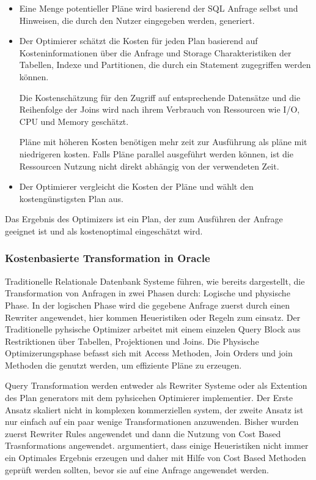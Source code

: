 \begin{itemize}
\item Eine Menge potentieller Pläne wird basierend der SQL Anfrage selbst und Hinweisen, die durch den Nutzer eingegeben werden, generiert.
\item Der Optimierer schätzt die Kosten für jeden Plan basierend auf Kosteninformationen über die Anfrage und Storage Charakteristiken der Tabellen, Indexe und Partitionen, die durch ein Statement zugegriffen werden können.

Die Kostenschätzung für den Zugriff auf entsprechende Datensätze und die Reihenfolge der Joins wird nach ihrem Verbrauch von Ressourcen wie I/O, CPU und Memory geschätzt.

Pläne mit höheren Kosten benötigen mehr zeit zur Ausführung als pläne mit niedrigeren kosten. Falls Pläne parallel ausgeführt werden können, ist die Ressourcen Nutzung nicht direkt abhängig von der verwendeten Zeit.

\item Der Optimierer vergleicht die Kosten der Pläne und wählt den kostengünstigsten Plan aus.
\end{itemize}

Das Ergebnis des Optimizers ist ein Plan, der zum Ausführen der Anfrage geeignet ist und als kostenoptimal eingeschätzt wird.


\subsubsection{Kostenbasierte Transformation in Oracle}

Traditionelle Relationale Datenbank Systeme führen, wie bereits dargestellt, die Transformation von Anfragen in zwei Phasen durch: Logische und physische Phase. In der logischen Phase wird die gegebene Anfrage zuerst durch einen Rewriter angewendet, hier kommen Heueristiken oder Regeln zum einsatz. Der Traditionelle pyhsische Optimizer arbeitet mit einem einzelen Query Block aus Restriktionen über Tabellen, Projektionen und Joins. Die Physische Optimizerungsphase befasst sich mit Access Methoden, Join Orders und join Methoden die genutzt werden, um effiziente Pläne zu erzeugen.

Query Transformation werden entweder als Rewriter Systeme oder als Extention des Plan generators mit dem pyhsicehen Optimierer implementier. Der Erste Ansatz skaliert nicht in komplexen kommerziellen system, der zweite Ansatz ist nur einfach auf ein paar wenige Transformationen anzuwenden. 
Bisher wurden zuerst Rewriter Rules angewendet und dann die Nutzung von Cost Based Trasnformations angewendet. \cite{ahmed2006cost} argumentiert, dass einige Heueristiken nicht immer ein Optimales Ergebnis erzeugen und daher mit Hilfe von Cost Based Methoden geprüft werden sollten, bevor sie auf eine Anfrage angewendet werden.


